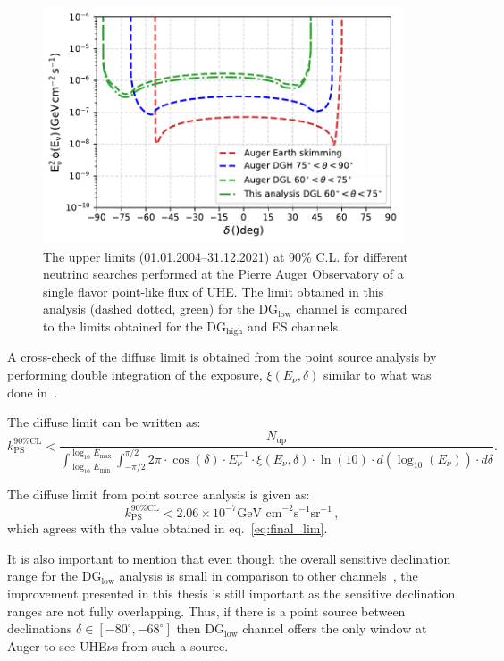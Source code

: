 \begin{figure}[ht]
  \centering
  
  \includegraphics[width=0.95\textwidth]{thesis_figures/PointLimits/Point_comp_combined_3.pdf}
  \caption{The upper limits  (01.01.2004–31.12.2021) at 90\% C.L. for different neutrino searches performed at the Pierre Auger Observatory of a single flavor point-like flux of UHE. The limit obtained in this analysis (dashed dotted, green) for the DG$_{\text{low}}$ channel is compared to the limits obtained for the DG$_{\text{high}}$ and ES channels.}
  \label{fig:Dec_limit_comb3}
\end{figure}

A cross-check of the diffuse limit is obtained from the point source analysis by performing double integration of the exposure, $\xi(E_{\nu}, \delta)$ similar to what was done in~\cite{gap_note_2013}.

The diffuse limit can be written as:
\begin{equation}
  k_{\text{PS}}^{90\% \text{CL}} < \frac{N_{\text{up}}}{\int_{\log_{10}E_{\text{min}}}^{\log_{10}E_{\text{max}}} \int_{-\pi/2}^{\pi/2}2\pi \cdot \cos(\delta) \cdot E_{\nu}^{-1} \cdot \xi(E_{\nu}, \delta) \cdot \ln(10) \cdot d(\log_{10}(E_{\nu})) \cdot d\delta} .
\end{equation}

The diffuse limit from point source analysis is given as: 
\begin{equation}
  k_{\text{PS}}^{90\%\text{CL}} < 2.06 \times 10^{-7} \text{GeV cm}^{-2} \text{s}^{-1} \text{sr}^{-1}\, ,
\end{equation}
which agrees with the value obtained in eq.~\ref{eq:final_lim}.

It is also important to mention that even though the overall sensitive declination range for the DG$_{\text{low}}$ analysis is small in comparison to other channels~\cite{Aab_2019_point}, the improvement presented in this thesis is still important as the sensitive declination ranges are not fully overlapping. Thus, if there is a point source between declinations $ \delta \in [-80^{\circ}, -68^{\circ}]$ then DG$_{\text{low}}$ channel offers the only window at Auger to see UHE$\nu$s from such a source.  

